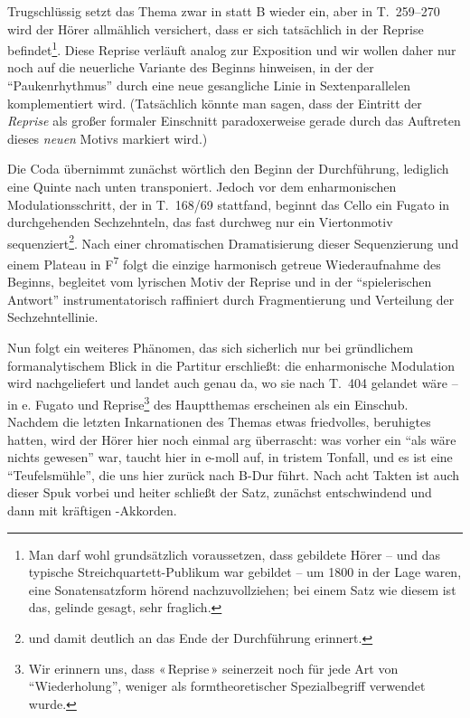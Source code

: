 Trugschlüssig setzt das Thema zwar in  statt B
wieder ein, aber in T.~259–270 wird der Hörer allmählich versichert,
dass er sich tatsächlich in der Reprise befindet\footnote{Man darf wohl
grundsätzlich voraussetzen, dass gebildete Hörer – und das
typische Streichquartett-Publikum war gebildet – um 1800 in der
Lage waren, eine Sonatensatzform hörend nachzuvollziehen; bei
einem Satz wie diesem ist das, gelinde gesagt, sehr fraglich.}.  Diese
Reprise verläuft analog zur Exposition und wir wollen daher nur
noch auf die neuerliche Variante des Beginns hinweisen, in der der
\enquote{Paukenrhythmus} durch eine neue gesangliche Linie in Sextenparallelen
komplementiert wird.  (Tatsächlich könnte man sagen, dass der
Eintritt der \emph{Reprise} als großer formaler Einschnitt paradoxerweise
gerade durch das Auftreten dieses \emph{neuen} Motivs markiert wird.)

Die Coda übernimmt zunächst wörtlich den Beginn der Durchführung,
lediglich eine Quinte nach unten transponiert.  Jedoch vor dem
enharmonischen Modulationsschritt, der in T.~168/69 stattfand,
beginnt das Cello ein Fugato in durchgehenden Sechzehnteln, das
fast durchweg nur ein Viertonmotiv sequenziert\footnote{und damit deutlich
an das Ende der Durchführung erinnert.}.  Nach einer chromatischen
Dramatisierung dieser Sequenzierung und einem Plateau in
F\textsuperscript{7} folgt die einzige harmonisch getreue
Wiederaufnahme des Beginns, begleitet vom lyrischen Motiv der
Reprise und in der \enquote{spielerischen Antwort} instrumentatorisch
raffiniert durch Fragmentierung und Verteilung der Sechzehntellinie.

Nun folgt ein weiteres Phänomen, das sich sicherlich nur bei
gründlichem formanalytischem Blick in die Partitur erschließt:
die enharmonische Modulation wird nachgeliefert und
landet auch genau da, wo sie nach T.~404 gelandet wäre –
in e.  Fugato und Reprise\footnote{Wir erinnern uns, dass
«\,Reprise\,» seinerzeit noch für jede Art von \enquote{Wiederholung},
weniger als formtheoretischer Spezialbegriff verwendet wurde.} des
Hauptthemas erscheinen als ein Einschub.  Nachdem die letzten
Inkarnationen des Themas etwas friedvolles, beruhigtes hatten,
wird der Hörer hier noch einmal arg überrascht: was vorher
ein \enquote{als wäre nichts gewesen} war, taucht hier in e-moll auf,
in tristem Tonfall, und es ist eine \enquote{Teufelsmühle},
die uns hier zurück nach B-Dur führt.  Nach acht Takten ist auch
dieser Spuk vorbei und heiter schließt der Satz, zunächst
entschwindend und dann mit kräftigen -Akkorden.